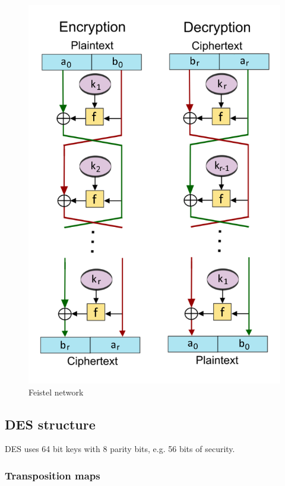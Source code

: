 \documentclass[a4paper]{scrartcl}
\begin{document}
\begin{figure}
    \centering
    \includegraphics[scale=0.35]{images/feistel.png}
    \caption{Feistel network}
\end{figure}

\subsection{DES structure}

DES uses 64 bit keys with 8 parity bits, e.g. 56 bits of security.

\subsubsection{Transposition maps}
\end{document}
